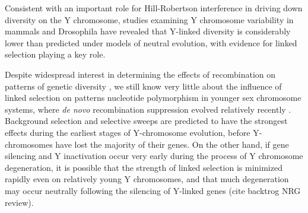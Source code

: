 \documentclass[9pt,twocolumn,twoside]{gsajnl}
\begin{document}
Consistent with an important role for Hill-Robertson interference in driving down diversity on the Y chromosome, studies examining Y chromosome variability in mammals \citep{hellborg2004,bachtrog2013NRG,Wilsonsayres2014} and Drosophila \citep{mcallister1999,bachtrog2000} have revealed that Y-linked diversity is considerably lower than predicted under models of neutral evolution, with evidence for linked selection playing a key role.






Despite widespread interest in determining the effects of recombination on patterns of genetic diversity \citep{ellegren2011,bachtrog2013NRG}, we still know very little about the influence of linked selection on patterns nucleotide polymorphism in younger sex chromosome systems, where \textit{de novo} recombination suppression evolved relatively recently \citep{charlesworth2016plant}. Background selection and selective sweeps are predicted to have the strongest effects during the earliest stages of Y-chromosome evolution, before Y-chromosomes have lost the majority of their genes. On the other hand, if gene silencing and Y inactivation occur very early during the process of Y chromosome degeneration, it is possible that the strength of linked selection is minimized rapidly even on relatively young Y chromosomes, and that much degeneration may occur neutrally following the silencing of Y-linked genes (cite backtrog NRG review).
\end{document}
